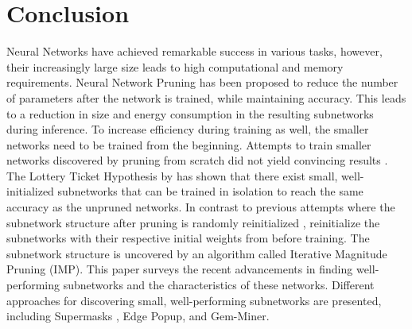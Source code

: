\section{Conclusion}

Neural Networks have achieved remarkable success in various tasks, however, their increasingly large size leads to high computational and memory requirements.
Neural Network Pruning \autocite{LeCun, OptimalBrainSurgeon, HanEtAl15, PruningFiltersForEfficientConvets} has been proposed to reduce the number of parameters after the network is trained, while maintaining accuracy.
This leads to a reduction in size \autocite{HanEtAl15} and energy consumption \autocite{YangCS17} in the resulting subnetworks during inference.
To increase efficiency during training as well, the smaller networks need to be trained from the beginning. Attempts to train smaller networks discovered by pruning from scratch did not yield convincing results \autocite{HanEtAl15, PruningFiltersForEfficientConvets}.
The Lottery Ticket Hypothesis by \textcite{DBLP:conf/iclr/FrankleC19} has shown that there exist small, well-initialized subnetworks that can be trained in isolation to reach the same accuracy as the unpruned networks. 
In contrast to previous attempts where the subnetwork structure after pruning is randomly reinitialized \autocite{HanEtAl15, PruningFiltersForEfficientConvets}, \textcite{DBLP:conf/iclr/FrankleC19} reinitialize the subnetworks with their respective initial weights from before training.
The subnetwork structure is uncovered by an algorithm called Iterative Magnitude Pruning (IMP).
This paper surveys the recent advancements in finding well-performing subnetworks and the characteristics of these networks. Different approaches for discovering small, well-performing subnetworks are presented, including Supermasks \autocite{DBLP:conf/nips/ZhouLLY19}, Edge Popup\autocite{DBLP:conf/cvpr/RamanujanWKFR20}, and Gem-Miner\autocite{RareGems}.